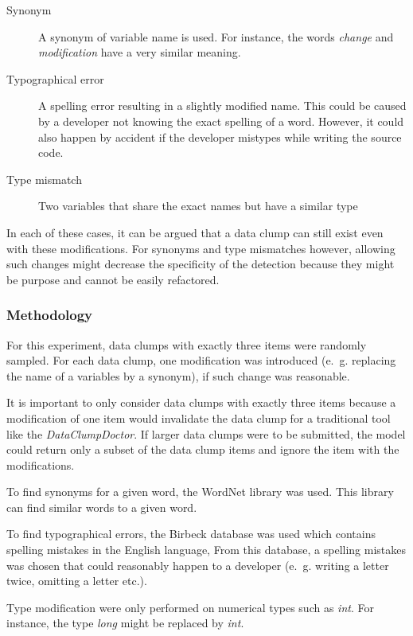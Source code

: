 \begin{description}
    \item[Synonym] A synonym of variable name is used. For instance, the words \textit{change} and \textit{modification} have a very similar  meaning. 

    \item[ Typographical error] A spelling error resulting in a slightly modified name. This could be caused by a developer not knowing the exact spelling of a word. However, it could also happen by accident if the developer mistypes while writing the source code.

    \item [Type mismatch] Two variables that share the exact names but have a similar type 
\end{description}

In each of these cases, it can be argued that a data clump can still exist even with these modifications. For synonyms and type mismatches however, allowing such changes might decrease the specificity of the detection because they might be purpose and cannot be easily refactored. 

\subsubsection{Methodology}

For this experiment, data clumps with exactly three items were randomly sampled. For each data clump, one modification was introduced (e.~g. replacing the name of a variables by a synonym), if such change was reasonable.

It is important to only consider data clumps with exactly three items because  a modification of one item would invalidate the data clump for a traditional tool like the \textit{DataClumpDoctor}. If larger data clumps were to be submitted, the model could return only a subset of the data clump items and ignore the item with the modifications. 

To find synonyms for a given word, the WordNet \cite{10.7551/mitpress/7287.001.0001} library was used. This library can find similar words to a given word.

To find typographical errors, the Birbeck database \cite{birbeck} was used which contains spelling mistakes in the English language, From this database, a spelling mistakes was chosen that could reasonably happen to a developer (e.~g. writing a letter twice, omitting a letter etc.). 

Type modification were only performed on numerical types such as \textit{int}. For instance,  the type \textit{long} might be replaced by \textit{int}. 
